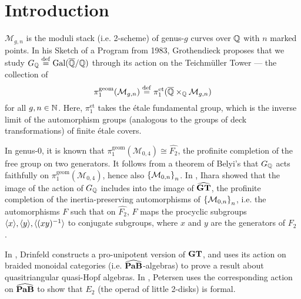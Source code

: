 \chapter{Introduction}
$\mathcal{M}_{g,n}$ is the moduli stack (i.e. 2-scheme) of genus-$g$ curves over $\mathbb{Q}$ with $n$ marked points. In his Sketch of a Program \cite{Grothendieck_1997} from 1983, Grothendieck proposes that we study $G_{\mathbb{Q}}\overset{\mathrm{def}}{=}\mathrm{Gal}(\overline{\mathbb{Q}}/\mathbb{Q})$ through its action on the Teichm\"uller Tower --- the collection of
\[\pi^{\mathrm{geom}}_1(\mathcal{M}_{g,n})\overset{\mathrm{def}}{=}\pi_1^{\mathrm{et}}(\overline{\mathbb{Q}}\times_{\mathbb{Q}}\mathcal{M}_{g,n})\]
for all $g,n\in\mathbb{N}$. Here, $\pi_1^{\mathrm{et}}$ takes the \'etale fundamental group, which is the inverse limit of the automorphism groups (analogous to the groups of deck transformations) of finite \'etale covers.

In genus-0, it is known that $\pi^{\mathrm{geom}}_1(\mathcal{M}_{0,4})\cong\widehat{F_2}$, the profinite completion of the free group on two generators. It follows from a theorem of Belyi's \cite{Belyĭ_1980} that $G_{\mathbb{Q}}$ acts faithfully on $\pi^{\mathrm{geom}}_1(\mathcal{M}_{0,4})$, hence also $\left\{\mathcal{M}_{0,n}\right\}_n$. In \cite{Ihara_1991}, Ihara showed that the image of the action of $G_{\mathbb{Q}}$ includes into the image of $\widehat{\mathbf{GT}}$, the profinite completion of the inertia-preserving automorphisms of $\left\{\mathcal{M}_{0,n}\right\}_n$, i.e. the automorphisms $F$ such that on $\widehat{F_2}$, $F$ maps the procyclic subgroups $\langle x\rangle,\langle y\rangle,\langle(xy)^{-1}\rangle$ to conjugate subgroups, where $x$ and $y$ are the generators of $F_2$ \cite{Lochak}.

In \cite{Drinfeld_1991}, Drinfeld constructs a pro-unipotent
version of $\mathbf{GT}$, and uses its action on braided monoidal categories (i.e. $\widehat{\mathbf{PaB}}$-algebras) to prove a result about quasitriangular quasi-Hopf algebras.
In \cite{Petersen_2014}, Petersen uses the corresponding action on $\widehat{\mathbf{PaB}}$ to show that $E_2$ (the operad of little 2-disks) is formal.